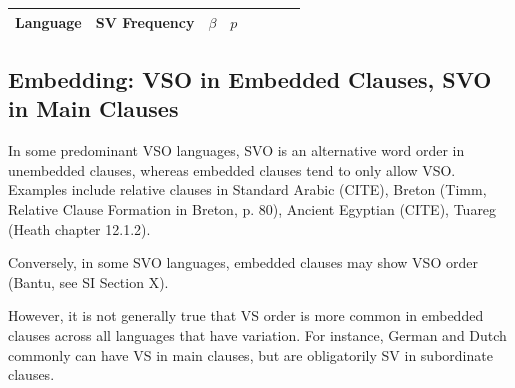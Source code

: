 \documentclass[11pt,a4paper]{article}
\begin{document}
\begin{longtable}{l|lllllll}
Language & SV Frequency & $\beta$ & $p$ \\ \hline
%
\end{longtable}


\subsection{Embedding: VSO in Embedded Clauses, SVO in Main Clauses}
In some predominant VSO languages, SVO is an alternative word order in unembedded clauses, whereas embedded clauses tend to only allow VSO.
Examples include relative clauses in Standard Arabic (CITE), Breton (Timm, Relative Clause Formation in Breton, p. 80), Ancient Egyptian (CITE), Tuareg (Heath chapter 12.1.2).


Conversely, in some SVO languages, embedded clauses may show VSO order (Bantu, see SI Section X).

However, it is not generally true that VS order is more common in embedded clauses across all languages that have variation. For instance, German and Dutch commonly can have VS in main clauses, but are obligatorily SV in subordinate clauses.

\end{document}
